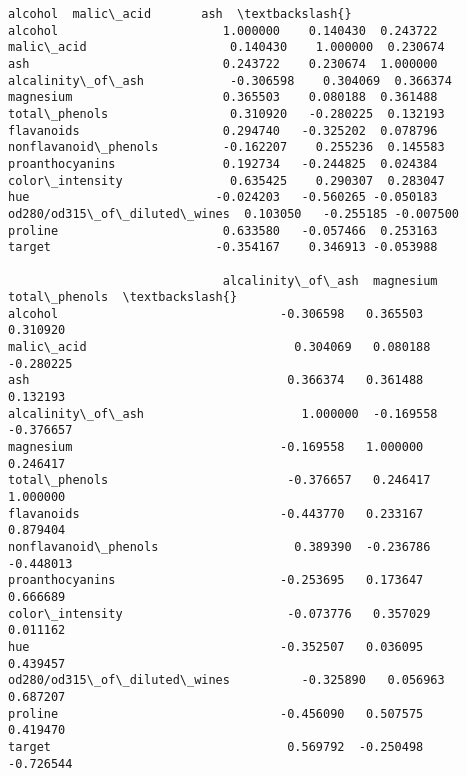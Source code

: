 \documentclass[11pt]{article}
\makeatletter
\newcommand{\boxspacing}{\kern\kvtcb@left@rule\kern\kvtcb@boxsep}
\newcommand{\prompt}[4]{
        {\ttfamily\llap{{\color{#2}[#3]:\hspace{3pt}#4}}\vspace{-\baselineskip}}
    }
\makeatother
\begin{document}
            \begin{tcolorbox}[breakable, size=fbox, boxrule=.5pt, pad at break*=1mm, opacityfill=0]
\prompt{Out}{outcolor}{121}{\boxspacing}
\begin{Verbatim}[commandchars=\\\{\}]
                               alcohol  malic\_acid       ash  \textbackslash{}
alcohol                       1.000000    0.140430  0.243722
malic\_acid                    0.140430    1.000000  0.230674
ash                           0.243722    0.230674  1.000000
alcalinity\_of\_ash            -0.306598    0.304069  0.366374
magnesium                     0.365503    0.080188  0.361488
total\_phenols                 0.310920   -0.280225  0.132193
flavanoids                    0.294740   -0.325202  0.078796
nonflavanoid\_phenols         -0.162207    0.255236  0.145583
proanthocyanins               0.192734   -0.244825  0.024384
color\_intensity               0.635425    0.290307  0.283047
hue                          -0.024203   -0.560265 -0.050183
od280/od315\_of\_diluted\_wines  0.103050   -0.255185 -0.007500
proline                       0.633580   -0.057466  0.253163
target                       -0.354167    0.346913 -0.053988

                              alcalinity\_of\_ash  magnesium  total\_phenols  \textbackslash{}
alcohol                               -0.306598   0.365503       0.310920
malic\_acid                             0.304069   0.080188      -0.280225
ash                                    0.366374   0.361488       0.132193
alcalinity\_of\_ash                      1.000000  -0.169558      -0.376657
magnesium                             -0.169558   1.000000       0.246417
total\_phenols                         -0.376657   0.246417       1.000000
flavanoids                            -0.443770   0.233167       0.879404
nonflavanoid\_phenols                   0.389390  -0.236786      -0.448013
proanthocyanins                       -0.253695   0.173647       0.666689
color\_intensity                       -0.073776   0.357029       0.011162
hue                                   -0.352507   0.036095       0.439457
od280/od315\_of\_diluted\_wines          -0.325890   0.056963       0.687207
proline                               -0.456090   0.507575       0.419470
target                                 0.569792  -0.250498      -0.726544


\end{Verbatim}
\end{tcolorbox}
\end{document}
